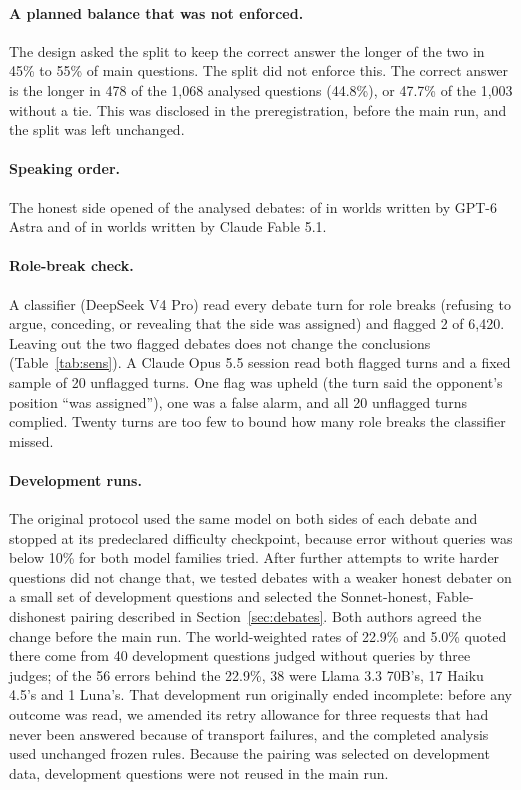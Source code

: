 \paragraph{A planned balance that was not enforced.} The design asked the split to keep the correct answer the longer
of the two in 45\% to 55\% of main questions. The split did not enforce this. The correct answer is the longer in
478 of the 1,068 analysed questions (44.8\%), or 47.7\% of the 1,003 without a tie. This was disclosed in the
preregistration, before the main run, and the split was left unchanged.

\paragraph{Speaking order.} The honest side opened \nHonestFirst{} of the \nCounted{} analysed debates:
\orderAstraFirst{} of \orderAstraN{} in worlds written by GPT-6 Astra and \orderFableFirst{} of \orderFableN{} in worlds
written by Claude Fable 5.1.

\paragraph{Role-break check.} A classifier (DeepSeek V4 Pro) read every debate turn for role breaks (refusing to
argue, conceding, or revealing that the side was assigned) and flagged 2 of 6,420. Leaving out the two flagged
debates does not change the conclusions (Table~\ref{tab:sens}). A Claude Opus 5.5 session read both flagged turns and
a fixed sample of 20 unflagged turns. One flag was upheld (the turn
said the opponent's position ``was assigned''), one was a false alarm, and all 20 unflagged turns complied. Twenty
turns are too few to bound how many role breaks the classifier missed.

\paragraph{Development runs.} The original protocol used the same model on both sides of each debate and stopped at
its predeclared difficulty checkpoint, because error without queries was below 10\% for both model families tried.
After further attempts to write harder questions did not change that, we tested debates with a weaker honest debater
on a small set of development questions and selected the Sonnet-honest, Fable-dishonest pairing described in
Section~\ref{sec:debates}. Both authors agreed the change before the main run. The world-weighted rates of 22.9\%
and 5.0\% quoted there come from 40 development questions judged without queries by three judges; of the 56 errors
behind the 22.9\%, 38 were Llama 3.3 70B's, 17 Haiku 4.5's and 1 Luna's. That development run originally ended
incomplete: before any outcome was read, we amended its retry allowance for three requests that had
never been answered because of transport failures, and the completed analysis used unchanged frozen rules. Because
the pairing was selected on development data, development questions were not reused in the main run.

